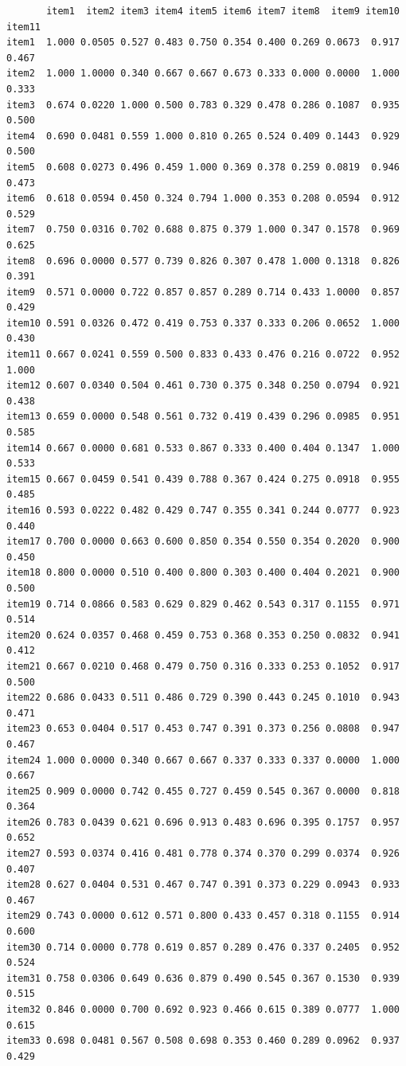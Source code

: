 \documentclass[
  a4paper,
]{ltjsbook}
\begin{document}
\begin{verbatim}
       item1  item2 item3 item4 item5 item6 item7 item8  item9 item10 item11
item1  1.000 0.0505 0.527 0.483 0.750 0.354 0.400 0.269 0.0673  0.917  0.467
item2  1.000 1.0000 0.340 0.667 0.667 0.673 0.333 0.000 0.0000  1.000  0.333
item3  0.674 0.0220 1.000 0.500 0.783 0.329 0.478 0.286 0.1087  0.935  0.500
item4  0.690 0.0481 0.559 1.000 0.810 0.265 0.524 0.409 0.1443  0.929  0.500
item5  0.608 0.0273 0.496 0.459 1.000 0.369 0.378 0.259 0.0819  0.946  0.473
item6  0.618 0.0594 0.450 0.324 0.794 1.000 0.353 0.208 0.0594  0.912  0.529
item7  0.750 0.0316 0.702 0.688 0.875 0.379 1.000 0.347 0.1578  0.969  0.625
item8  0.696 0.0000 0.577 0.739 0.826 0.307 0.478 1.000 0.1318  0.826  0.391
item9  0.571 0.0000 0.722 0.857 0.857 0.289 0.714 0.433 1.0000  0.857  0.429
item10 0.591 0.0326 0.472 0.419 0.753 0.337 0.333 0.206 0.0652  1.000  0.430
item11 0.667 0.0241 0.559 0.500 0.833 0.433 0.476 0.216 0.0722  0.952  1.000
item12 0.607 0.0340 0.504 0.461 0.730 0.375 0.348 0.250 0.0794  0.921  0.438
item13 0.659 0.0000 0.548 0.561 0.732 0.419 0.439 0.296 0.0985  0.951  0.585
item14 0.667 0.0000 0.681 0.533 0.867 0.333 0.400 0.404 0.1347  1.000  0.533
item15 0.667 0.0459 0.541 0.439 0.788 0.367 0.424 0.275 0.0918  0.955  0.485
item16 0.593 0.0222 0.482 0.429 0.747 0.355 0.341 0.244 0.0777  0.923  0.440
item17 0.700 0.0000 0.663 0.600 0.850 0.354 0.550 0.354 0.2020  0.900  0.450
item18 0.800 0.0000 0.510 0.400 0.800 0.303 0.400 0.404 0.2021  0.900  0.500
item19 0.714 0.0866 0.583 0.629 0.829 0.462 0.543 0.317 0.1155  0.971  0.514
item20 0.624 0.0357 0.468 0.459 0.753 0.368 0.353 0.250 0.0832  0.941  0.412
item21 0.667 0.0210 0.468 0.479 0.750 0.316 0.333 0.253 0.1052  0.917  0.500
item22 0.686 0.0433 0.511 0.486 0.729 0.390 0.443 0.245 0.1010  0.943  0.471
item23 0.653 0.0404 0.517 0.453 0.747 0.391 0.373 0.256 0.0808  0.947  0.467
item24 1.000 0.0000 0.340 0.667 0.667 0.337 0.333 0.337 0.0000  1.000  0.667
item25 0.909 0.0000 0.742 0.455 0.727 0.459 0.545 0.367 0.0000  0.818  0.364
item26 0.783 0.0439 0.621 0.696 0.913 0.483 0.696 0.395 0.1757  0.957  0.652
item27 0.593 0.0374 0.416 0.481 0.778 0.374 0.370 0.299 0.0374  0.926  0.407
item28 0.627 0.0404 0.531 0.467 0.747 0.391 0.373 0.229 0.0943  0.933  0.467
item29 0.743 0.0000 0.612 0.571 0.800 0.433 0.457 0.318 0.1155  0.914  0.600
item30 0.714 0.0000 0.778 0.619 0.857 0.289 0.476 0.337 0.2405  0.952  0.524
item31 0.758 0.0306 0.649 0.636 0.879 0.490 0.545 0.367 0.1530  0.939  0.515
item32 0.846 0.0000 0.700 0.692 0.923 0.466 0.615 0.389 0.0777  1.000  0.615
item33 0.698 0.0481 0.567 0.508 0.698 0.353 0.460 0.289 0.0962  0.937  0.429

\end{verbatim}
\end{document}
